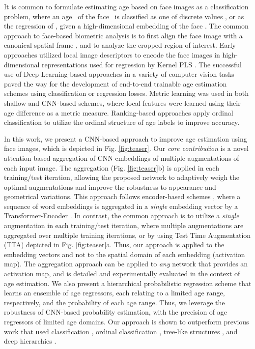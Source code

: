 \documentclass[10pt,journal]{IEEEtran}\usepackage{amsfonts}
\begin{document}
It is common to formulate estimating age based on face images as a
classification problem, where an age \ of the face \ is
classified as one of 
discrete values
\cite{eidinger2014age,guo2011simultaneous,chang2011ordinal,ZhengSun2012,ramon2012gender,guo2010human}, or as the regression of , given a
high-dimensional embedding  of the face 
\cite{guo2011simultaneous,guo2010human,eidinger2014age,wang2015age,ChenGong2013,leviage}. The common approach to face-based biometric analysis is to first align the
face image with a canonical spatial frame \cite{RetinaFace}, and to analyze
the cropped region of interest. Early approaches utilized local image
descriptors \cite{ramon2012gender} to encode the face images in
high-dimensional representations used for regression by Kernel PLS
\cite{guo2011simultaneous}. The successful use of Deep Learning-based
approaches in a variety of computer vision tasks paved the way for the
development of end-to-end trainable age estimation schemes
\cite{8017500,deepage} using classification or regression losses. Metric
learning was used in both shallow \cite{1640964} and CNN-based
\cite{8017500,8578147,TianCCY19} schemes, where local features were learned
using their age difference as a metric measure. Ranking-based approaches
\cite{8099569,7780901, 9145576, Dark_Knowledge} apply ordinal classification
to utilize the ordinal structure of age labels to improve accuracy.

In this work, we present a CNN-based approach to improve age estimation using
face images, which is depicted in Fig. \ref{fig:teaser}. Our \textit{core
contribution} is a novel attention-based aggregation of CNN embeddings of
multiple augmentations of each input image. The aggregation (Fig.
\ref{fig:teaser}b) is applied in each training/test iteration, allowing the
proposed network to adaptively weigh the optimal augmentations and improve the
robustness to appearance and geometrical variations. This approach follows
encoder-based schemes \cite{bert}, where a sequence of word embeddings is
aggregated in a \textit{single} embedding vector by a Transformer-Encoder
\cite{AttentionIsAllYouNeed}. In contrast, the common approach is to utilize a
\textit{single} augmentation in each training/test iteration, where multiple
augmentations are aggregated over multiple training iterations, or by using
Test Time Augmentation (TTA) \cite{TTA-NIPS} depicted in Fig. \ref{fig:teaser}a. Thus, our approach is applied to the embedding vectors and not to the
spatial domain of each embedding (activation map). The aggregation approach
can be applied to \textit{any} network that provides an activation map, and is
detailed and experimentally evaluated in the context of age estimation. We
also present a hierarchical probabilistic regression scheme that learns an
ensemble of age regressors, each relating to a limited age range,
respectively, and the probability of each age range. Thus, we leverage the
robustness of CNN-based probability estimation, with the precision of age
regressors of limited age domains. Our approach is shown to outperform
previous work that used classification \cite{eidinger2014age,leviage}, ordinal
classification \cite{8099569, 7780901, 9145576, coral}, tree-like structures
\cite{8954134}, and deep hierarchies \cite{8954134}.
\end{document}
